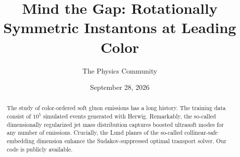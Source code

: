 \documentclass[11pt]{article}
\title{Mind the Gap: Rotationally Symmetric Instantons at Leading Color}
\author{The Physics Community}
\date{September 28, 2026}
\numberwithin{equation}{section}
\theoremstyle{definition}
\theoremstyle{remark}
\begin{document}
\maketitle
\begin{abstract}
The study of color-ordered soft gluon emissions has a long history. The
training data consist of $10^5$ simulated events generated with Herwig.
Remarkably, the so-called dimensionally regularized jet mass
distribution captures boosted ultrasoft modes for any number of
emissions. Crucially, the Lund planes of the so-called collinear-safe
embedding dimension enhance the Sudakov-suppressed optimal transport
solver. Our code is publicly available.
\end{abstract}
\tableofcontents





\nocite{*}


\end{document}
